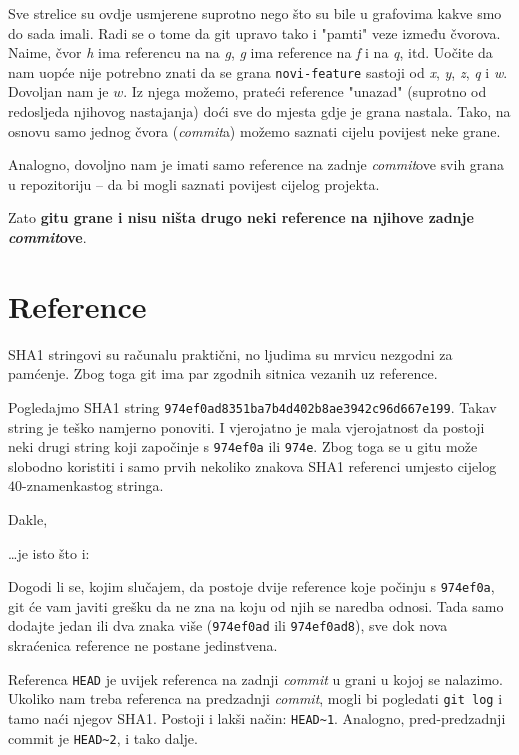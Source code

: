 Sve strelice su ovdje usmjerene suprotno nego što su bile u grafovima kakve smo do sada imali.
Radi se o tome da git upravo tako i "pamti" veze između čvorova.
Naime, čvor \emph h ima referencu na na \emph g, \emph g ima reference na \emph f i na \emph q, itd.
Uočite da nam uopće nije potrebno znati da se grana \verb+novi-feature+ sastoji od \emph x, \emph y, \emph z, \emph q i \emph w.
Dovoljan nam je $w$.
Iz njega možemo, prateći reference "unazad" (suprotno od redosljeda njihovog nastajanja) doći sve do mjesta gdje je grana nastala.
Tako, na osnovu samo jednog čvora (\emph{commit}a) možemo saznati cijelu povijest neke grane.

Analogno, dovoljno nam je imati samo reference na zadnje \emph{commit}ove svih grana u repozitoriju -- da bi mogli saznati povijest cijelog projekta.

Zato \textbf{gitu grane i nisu ništa drugo neki reference na njihove zadnje \emph{commit}ove}.

\section*{Reference}

SHA1 stringovi su računalu praktični, no ljudima su mrvicu nezgodni za pamćenje.
Zbog toga git ima par zgodnih sitnica vezanih uz reference.

Pogledajmo SHA1 string \verb+974ef0ad8351ba7b4d402b8ae3942c96d667e199+.
Takav string je teško namjerno ponoviti. I vjerojatno je mala vjerojatnost da postoji neki drugi string koji započinje s \verb+974ef0a+ ili \verb+974e+.
Zbog toga se u gitu može slobodno koristiti i samo prvih nekoliko znakova SHA1 referenci umjesto cijelog $40$-znamenkastog stringa.

Dakle, 


\dots{}je isto što i:


Dogodi li se, kojim slučajem, da postoje dvije reference koje počinju s \verb+974ef0a+, git će vam javiti grešku da ne zna na koju od njih se naredba odnosi.
Tada samo dodajte jedan ili dva znaka više (\verb+974ef0ad+ ili \verb+974ef0ad8+), sve dok nova skraćenica reference ne postane jedinstvena.

Referenca \verb+HEAD+ je uvijek referenca na zadnji \emph{commit} u grani u kojoj se nalazimo.
Ukoliko nam treba referenca na predzadnji \emph{commit}, mogli bi pogledati \verb+git log+ i tamo naći njegov SHA1.
Postoji i lakši način: \verb+HEAD~1+.
Analogno, pred-predzadnji commit je \verb+HEAD~2+, i tako dalje.

